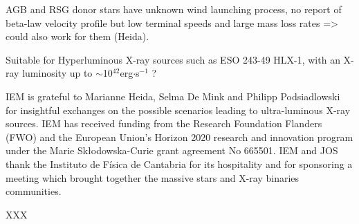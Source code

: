 \documentclass[letter]{aa}
\begin{document}
AGB and RSG donor stars have unknown wind launching process, no report of beta-law velocity profile but low terminal speeds and large mass loss rates => could also work for them (Heida).

Suitable for Hyperluminous X-ray sources such as ESO 243-49 HLX-1, with an X-ray luminosity up to $\sim$10$^{42}$erg$\cdot$s$^{-1}$ \citep{Farrell2009,Webb2017}?

\begin{acknowledgements}
IEM is grateful to Marianne Heida, Selma De Mink and Philipp Podsiadlowski for insightful exchanges on the possible scenarios leading to ultra-luminous X-ray sources. IEM has received funding from the Research Foundation Flanders (FWO) and the European Union's Horizon 2020 research and innovation program under the Marie Sk\l odowska-Curie grant agreement No 665501. IEM and JOS thank the Instituto de F\'{i}sica de Cantabria for its hospitality and for sponsoring a meeting which brought together the massive stars and X-ray binaries communities.
\end{acknowledgements}

XXX

\begin{tiny}

\end{tiny}
\end{document}
